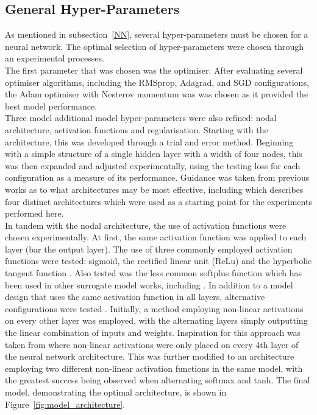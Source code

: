 \subsection{General Hyper-Parameters}

As mentioned in subsection~\ref{NN}, several hyper-parameters must be chosen for a neural network. The optimal selection of hyper-parameters were chosen through an experimental processes. 
\\

\noindent
The first parameter that was chosen was the optimiser. After evaluating several optimiser algorithms, including the RMSprop, Adagrad, and SGD configurations, the Adam optimiser with Nesterov momentum \cite{dozat2016incorporating} was was chosen as it provided the best model performance.
\\

\noindent
Three model additional model hyper-parameters were also refined: nodal architecture, activation functions and regularisation. Starting with the architecture, this was developed through a trial and error method. Beginning with a simple structure of a single hidden layer with a width of four nodes, this was then expanded and adjusted experimentally, using the testing loss for each configuration as a measure of its performance. Guidance was taken from previous works as to what architectures may be most effective, including \cite{fernandez2017nuclear} which describes four distinct architectures which were used as a starting point for the experiments performed here. 
\\

\noindent
In tandem with the nodal architecture, the use of activation functions were chosen experimentally. At first, the same activation function was applied to each layer (bar the output layer). The use of three commonly employed activation functions were tested: sigmoid, the rectified linear unit (ReLu) \cite{hara2015analysis} and the hyperbolic tangent function \cite{kalman1992tanh}. Also tested was the less common softplus function \cite{zheng2015improving} which has been used in other surrogate model works, including \cite{liang2018deep}. In addition to a model design that uses the same activation function in all layers, alternative configurations were tested . Initially, a method employing non-linear activations on every other layer was employed, with the alternating layers simply outputting the linear combination of inputs and weights. Inspiration for this approach was taken from \cite{ahn2020deep} where non-linear activations were only placed on every 4th layer of the neural network architecture. This was further modified to an architecture employing two different non-linear activation functions in the same model, with the greatest success being observed when alternating softmax and tanh. The final model, demonstrating the optimal architecture, is shown in Figure~\ref{fig:model_architecture}.
\\

